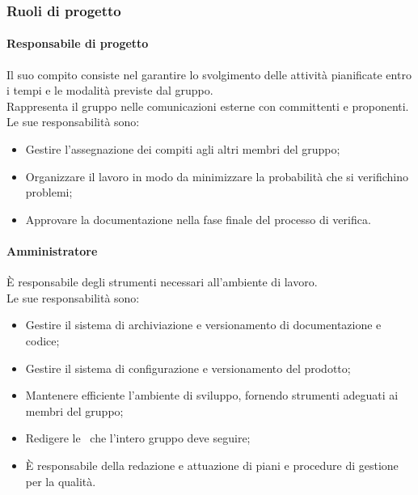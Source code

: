   \subsubsection{Ruoli di progetto}
  \paragraph{Responsabile di progetto}
      Il suo compito consiste nel garantire lo svolgimento delle attività pianificate entro i tempi e le modalità previste dal gruppo.\\
        Rappresenta il gruppo nelle comunicazioni esterne con committenti e proponenti.\\
        Le sue responsabilità sono:
        \begin{itemize}
          \item Gestire l'assegnazione dei compiti agli altri membri del gruppo;
          \item Organizzare il lavoro in modo da minimizzare la probabilità che si verifichino problemi;
          \item Approvare la documentazione nella fase finale del processo di verifica.
        \end{itemize}

      \paragraph{Amministratore}
        È responsabile degli strumenti necessari all'ambiente di lavoro.\\
        Le sue responsabilità sono:
        \begin{itemize}
          \item Gestire il sistema di archiviazione e versionamento di documentazione e codice;
          \item Gestire il sistema di configurazione e versionamento del prodotto;
          \item Mantenere efficiente l'ambiente di sviluppo, fornendo strumenti adeguati ai membri del gruppo;
          \item Redigere le \docNameVersionNdP\ che l'intero gruppo deve seguire;
          \item È responsabile della redazione e attuazione di piani e procedure di gestione per la qualità.
        \end{itemize}

